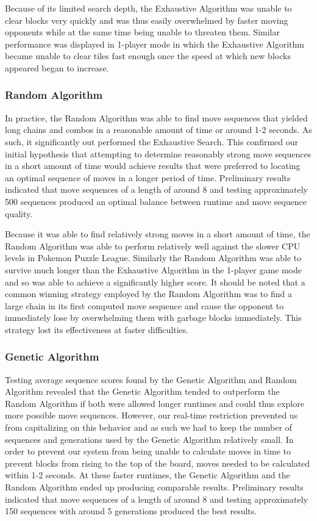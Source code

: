 \documentclass[12pt]{IEEEtran}
\begin{document}
Because of its limited search depth, the Exhaustive Algorithm was unable to clear blocks very quickly and was thus easily overwhelmed by faster moving opponents while at the same time being unable to threaten them. Similar performance was displayed in 1-player mode in which the Exhaustive Algorithm became unable to clear tiles fast enough once the speed at which new blocks appeared began to increase.

\subsubsection{Random Algorithm}

In practice, the Random Algorithm was able to find move sequences that yielded long chains and combos in a reasonable amount of time or around 1-2 seconds. As such, it significantly out performed the Exhaustive Search. This confirmed our initial hypothesis that attempting to determine reasonably strong move sequences in a short amount of time would achieve results that were preferred to locating an optimal sequence of moves in a longer period of time. Preliminary results indicated that move sequences of a length of around 8 and testing approximately 500 sequences produced an optimal balance between runtime and move sequence quality.

Because it was able to find relatively strong moves in a short amount of time, the Random Algorithm was able to perform relatively well against the slower CPU levels in Pokemon Puzzle League. Similarly the Random Algorithm was able to survive much longer than the Exhaustive Algorithm in the 1-player game mode and so was able to achieve a significantly higher score. It should be noted that a common winning strategy employed by the Random Algorithm was to find a large chain in its first computed move sequence and cause the opponent to immediately lose by overwhelming them with garbage blocks immediately. This strategy lost its effectiveness at faster difficulties.

\subsubsection{Genetic Algorithm}

Testing average sequence scores found by the Genetic Algorithm and Random Algorithm revealed that the Genetic Algorithm tended to outperform the Random Algorithm if both were allowed longer runtimes and could thus explore more possible move sequences. However, our real-time restriction prevented us from capitalizing on this behavior and as such we had to keep the number of sequences and generations used by the Genetic Algorithm relatively small. In order to prevent our system from being unable to calculate moves in time to prevent blocks from rising to the top of the board, moves needed to be calculated within 1-2 seconds. At these faster runtimes, the Genetic Algorithm and the Random Algorithm ended up producing comparable results. Preliminary results indicated that move sequences of a length of around 8 and testing approximately 150 sequences with around 5 generations produced the best results.
\end{document}
